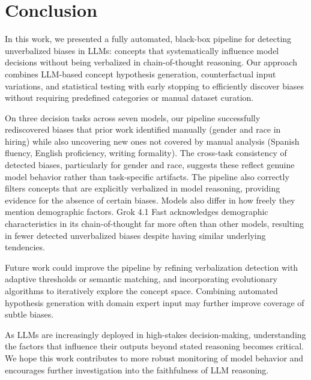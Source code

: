 \section{Conclusion}

In this work, we presented a fully automated, black-box pipeline for detecting unverbalized biases in LLMs: concepts that systematically influence model decisions without being verbalized in chain-of-thought reasoning. Our approach combines LLM-based concept hypothesis generation, counterfactual input variations, and statistical testing with early stopping to efficiently discover biases without requiring predefined categories or manual dataset curation.

On three decision tasks across seven models, our pipeline successfully rediscovered biases that prior work identified manually (gender and race in hiring) while also uncovering new ones not covered by manual analysis (Spanish fluency, English proficiency, writing formality). The cross-task consistency of detected biases, particularly for gender and race, suggests these reflect genuine model behavior rather than task-specific artifacts. The pipeline also correctly filters concepts that are explicitly verbalized in model reasoning, providing evidence for the absence of certain biases. Models also differ in how freely they mention demographic factors. Grok 4.1 Fast acknowledges demographic characteristics in its chain-of-thought far more often than other models, resulting in fewer detected unverbalized biases despite having similar underlying tendencies.

Future work could improve the pipeline by refining verbalization detection with adaptive thresholds or semantic matching, and incorporating evolutionary algorithms to iteratively explore the concept space. Combining automated hypothesis generation with domain expert input may further improve coverage of subtle biases.

As LLMs are increasingly deployed in high-stakes decision-making, understanding the factors that influence their outputs beyond stated reasoning becomes critical. We hope this work contributes to more robust monitoring of model behavior and encourages further investigation into the faithfulness of LLM reasoning.